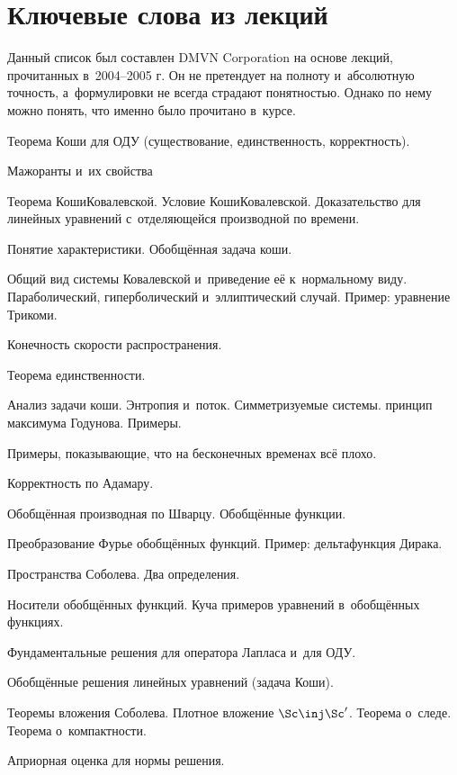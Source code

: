 \documentclass[a4paper]{article}
\begin{document}
\section{Ключевые слова из лекций}

Данный список был составлен DMVN Corporation на основе
лекций, прочитанных в~2004--2005 г. Он не претендует на полноту и~абсолютную точность,
а~формулировки не всегда страдают понятностью. Однако по нему можно понять, что именно
было прочитано в~курсе.

\begin{items}{-3}
\item Теорема Коши для ОДУ (существование, единственность, корректность).
\item Мажоранты и~их свойства
\item Теорема Коши\ч Ковалевской. Условие Коши\ч Ковалевской. Доказательство
      для линейных уравнений с~отделяющейся производной по времени.
\item Понятие характеристики. Обобщённая задача коши.
\item Общий вид системы Ковалевской и~приведение её к~нормальному виду.
      Параболический, гиперболический и~эллиптический случай.
      Пример: уравнение Трикоми.
\item Конечность скорости распространения.
\item Теорема единственности.
\item Анализ задачи коши. Энтропия и~поток. Симметризуемые системы.
      принцип максимума Годунова. Примеры.
\item Примеры, показывающие, что на бесконечных временах всё плохо.
\item Корректность по Адамару.
\item Обобщённая производная по Шварцу. Обобщённые функции.
\item Преобразование Фурье обобщённых функций. Пример: дельта\д функция Дирака.
\item Пространства Соболева. Два определения.
\item Носители обобщённых функций. Куча примеров уравнений в~обобщённых функциях.
\item Фундаментальные решения для оператора Лапласа и~для ОДУ.
\item Обобщённые решения линейных уравнений (задача Коши).
\item Теоремы вложения Соболева. Плотное вложение $\Sc \inj \Sc'$.
      Теорема о~следе. Теорема о~компактности.
\item Априорная оценка для нормы решения.

\end{items}
\end{document}
